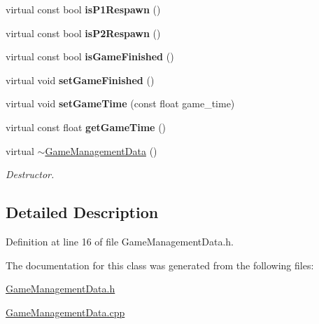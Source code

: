 \begin{DoxyCompactItemize}
\item 
\hypertarget{class_game_management_data_a2abb452bd5ecd1f8d09b76dc1f909260}{virtual const bool {\bfseries is\+P1\+Respawn} ()}\label{class_game_management_data_a2abb452bd5ecd1f8d09b76dc1f909260}

\item 
\hypertarget{class_game_management_data_a3b94efaf212d65515c1c511a17636b5f}{virtual const bool {\bfseries is\+P2\+Respawn} ()}\label{class_game_management_data_a3b94efaf212d65515c1c511a17636b5f}

\item 
\hypertarget{class_game_management_data_ac8d6deb9285fe8e5205f9984b0a2622d}{virtual const bool {\bfseries is\+Game\+Finished} ()}\label{class_game_management_data_ac8d6deb9285fe8e5205f9984b0a2622d}

\item 
\hypertarget{class_game_management_data_afef95ac9618619ca6ec29277fd04c361}{virtual void {\bfseries set\+Game\+Finished} ()}\label{class_game_management_data_afef95ac9618619ca6ec29277fd04c361}

\item 
\hypertarget{class_game_management_data_ae3ed7d9a9cbed2222ad34c52a4bcfd5c}{virtual void {\bfseries set\+Game\+Time} (const float game\+\_\+time)}\label{class_game_management_data_ae3ed7d9a9cbed2222ad34c52a4bcfd5c}

\item 
\hypertarget{class_game_management_data_aa507f9e395464888ad9dc66a90b1bbc3}{virtual const float {\bfseries get\+Game\+Time} ()}\label{class_game_management_data_aa507f9e395464888ad9dc66a90b1bbc3}

\item 
\hypertarget{class_game_management_data_aa665bdaa6c75dcf11c5e24bc6173d07b}{virtual \hyperlink{class_game_management_data_aa665bdaa6c75dcf11c5e24bc6173d07b}{$\sim$\+Game\+Management\+Data} ()}\label{class_game_management_data_aa665bdaa6c75dcf11c5e24bc6173d07b}

\begin{DoxyCompactList}\small\item\em Destructor. \end{DoxyCompactList}\end{DoxyCompactItemize}


\subsection{Detailed Description}


Definition at line 16 of file Game\+Management\+Data.\+h.



The documentation for this class was generated from the following files\+:\begin{DoxyCompactItemize}
\item 
\hyperlink{_game_management_data_8h}{Game\+Management\+Data.\+h}\item 
\hyperlink{_game_management_data_8cpp}{Game\+Management\+Data.\+cpp}\end{DoxyCompactItemize}
